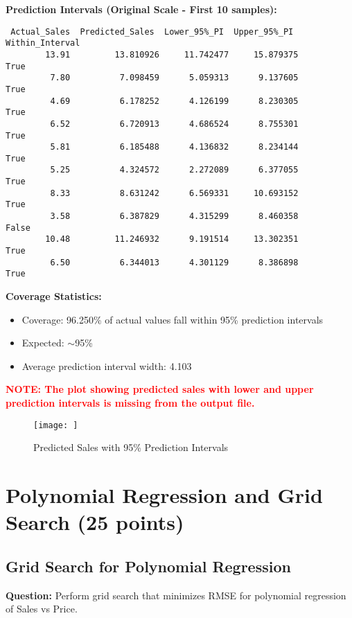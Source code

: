 \documentclass[11pt]{article}
\begin{document}
\textbf{Prediction Intervals (Original Scale - First 10 samples):}
\begin{verbatim}
 Actual_Sales  Predicted_Sales  Lower_95%_PI  Upper_95%_PI  Within_Interval
        13.91         13.810926     11.742477     15.879375             True
         7.80          7.098459      5.059313      9.137605             True
         4.69          6.178252      4.126199      8.230305             True
         6.52          6.720913      4.686524      8.755301             True
         5.81          6.185488      4.136832      8.234144             True
         5.25          4.324572      2.272089      6.377055             True
         8.33          8.631242      6.569331     10.693152             True
         3.58          6.387829      4.315299      8.460358            False
        10.48         11.246932      9.191514     13.302351             True
         6.50          6.344013      4.301129      8.386898             True
\end{verbatim}

\textbf{Coverage Statistics:}
\begin{itemize}
    \item Coverage: 96.250\% of actual values fall within 95\% prediction intervals
    \item Expected: $\sim$95\%
    \item Average prediction interval width: 4.103
\end{itemize}

\textcolor{red}{\textbf{NOTE: The plot showing predicted sales with lower and upper prediction intervals is missing from the output file.}}

\begin{figure}[H]
    \centering
    \texttt{[image: ]}
    \caption{Predicted Sales with 95\% Prediction Intervals}
    \label{fig:prediction_intervals}
\end{figure}

\section{Polynomial Regression and Grid Search (25 points)}

\subsection{Grid Search for Polynomial Regression}

\textbf{Question:} Perform grid search that minimizes RMSE for polynomial regression of Sales vs Price.
\end{document}
